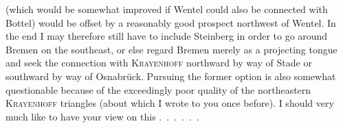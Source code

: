\noindent (which would be somewhat improved if Wentel could also be connected with Bottel) would be offset by a reasonably good prospect northwest of Wentel.
In the end I may therefore still have to include Steinberg in order to go around Bremen on the southeast, or else regard Bremen merely as a projecting tongue and seek the connection with \textsc{Krayenhoff} northward by way of Stade or southward by way of Osnabrück.
Pursuing the former option  is also somewhat questionable because of the exceedingly poor quality of the northeastern \textsc{Krayenhoff} triangles (about which I wrote to you once before).
I should very much like to have your view on this .\ .\ .\ .\ .\ .
